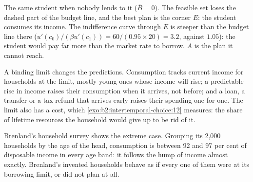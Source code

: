 \begin{omfigure}

{\small The same student when nobody lends to it ($\bar B = 0$). The feasible set loses the dashed
part of the budget line, and the best plan is the corner $E$: the student consumes its income. The
indifference curve through $E$ is steeper than the budget line there ($u'(c_0)/(\beta u'(c_1)) = 60/(0.95
\times 20) = 3.2$, against $1.05$): the student would pay far more than the market rate to borrow. $A$
is the plan it cannot reach.}
\end{omfigure}

A binding limit changes the predictions. Consumption tracks current income for households at the
limit, mostly young ones whose income will rise; a predictable rise in income raises their consumption
when it arrives, not before; and a loan, a transfer or a tax refund that arrives early raises their
spending one for one. The limit also has a cost, which \cref{exo:b2:intertemporal-choice:12} measures:
the share of lifetime resources the household would give up to be rid of it.

Brenland's household survey shows the extreme case. Grouping its 2,000 households by the age of the
head, consumption is between 92 and 97 per cent of disposable income in every age band: it follows the
hump of income almost exactly. Brenland's invented households behave as if every one of them were at
its borrowing limit, or did not plan at all.

